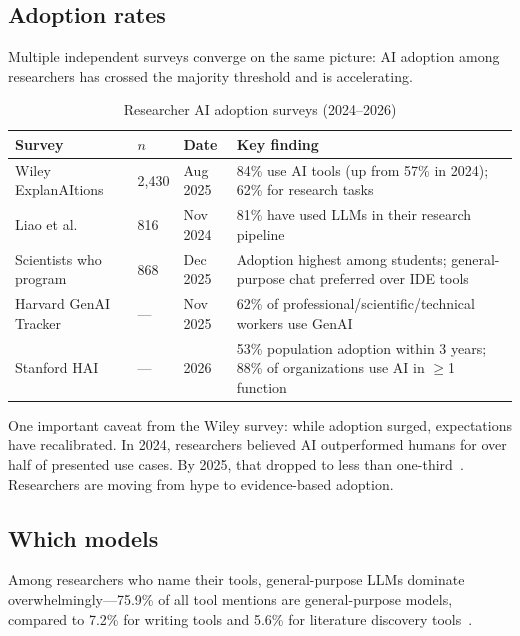 \documentclass[11pt,a4paper]{article}
\begin{document}
\subsection{Adoption rates}

Multiple independent surveys converge on the same picture: AI adoption among researchers has crossed the majority threshold and is accelerating.

\begin{table}[h]
\centering
\caption{Researcher AI adoption surveys (2024--2026)}
\label{tab:adoption}
\begin{tabular}{L{3.2cm} R{0.7cm} L{2.8cm} L{5.5cm}}
\toprule
\textbf{Survey} & \textbf{$n$} & \textbf{Date} & \textbf{Key finding} \\
\midrule
Wiley ExplanAItions~\cite{wiley2025} & 2,430 & Aug 2025 & 84\% use AI tools (up from 57\% in 2024); 62\% for research tasks \\
Liao et al.~\cite{liao2024} & 816 & Nov 2024 & 81\% have used LLMs in their research pipeline \\
Scientists who program~\cite{sciwhoprogram2025} & 868 & Dec 2025 & Adoption highest among students; general-purpose chat preferred over IDE tools \\
Harvard GenAI Tracker~\cite{harvard2025} & --- & Nov 2025 & 62\% of professional/scientific/technical workers use GenAI \\
Stanford HAI~\cite{stanfordhai2026} & --- & 2026 & 53\% population adoption within 3 years; 88\% of organizations use AI in $\geq$1 function \\
\bottomrule
\end{tabular}
\end{table}

One important caveat from the Wiley survey: while adoption surged, expectations have recalibrated. In 2024, researchers believed AI outperformed humans for over half of presented use cases. By 2025, that dropped to less than one-third~\cite{wiley2025}. Researchers are moving from hype to evidence-based adoption.

\subsection{Which models}

Among researchers who name their tools, general-purpose LLMs dominate overwhelmingly---75.9\% of all tool mentions are general-purpose models, compared to 7.2\% for writing tools and 5.6\% for literature discovery tools~\cite{wiley2025}.
\end{document}
